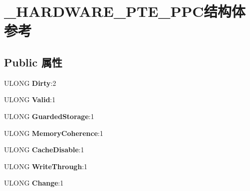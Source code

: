\hypertarget{struct___h_a_r_d_w_a_r_e___p_t_e___p_p_c}{}\section{\+\_\+\+H\+A\+R\+D\+W\+A\+R\+E\+\_\+\+P\+T\+E\+\_\+\+P\+P\+C结构体 参考}
\label{struct___h_a_r_d_w_a_r_e___p_t_e___p_p_c}
\subsection*{Public 属性}
\begin{DoxyCompactItemize}
\item 
\mbox{\label{struct___h_a_r_d_w_a_r_e___p_t_e___p_p_c_a92d2135be96d90cf3a939817af25fd09}} 
U\+L\+O\+NG {\bfseries Dirty}\+:2
\item 
\mbox{\label{struct___h_a_r_d_w_a_r_e___p_t_e___p_p_c_a76baf9bbde54bfa66a3c1a40997d4e3d}} 
U\+L\+O\+NG {\bfseries Valid}\+:1
\item 
\mbox{\label{struct___h_a_r_d_w_a_r_e___p_t_e___p_p_c_a78b95c6358ebbadd0c30df32af6b4ee4}} 
U\+L\+O\+NG {\bfseries Guarded\+Storage}\+:1
\item 
\mbox{\label{struct___h_a_r_d_w_a_r_e___p_t_e___p_p_c_a409dc5ee38c876cd36159cf3aafc65fd}} 
U\+L\+O\+NG {\bfseries Memory\+Coherence}\+:1
\item 
\mbox{\label{struct___h_a_r_d_w_a_r_e___p_t_e___p_p_c_a8a220905c9e76c7d205976d0734299c7}} 
U\+L\+O\+NG {\bfseries Cache\+Disable}\+:1
\item 
\mbox{\label{struct___h_a_r_d_w_a_r_e___p_t_e___p_p_c_a2b2f984b45348caa61ddd1539a16fd57}} 
U\+L\+O\+NG {\bfseries Write\+Through}\+:1
\item 
\mbox{\label{struct___h_a_r_d_w_a_r_e___p_t_e___p_p_c_a0e1bfd1e16592454bad3807e0ecdd7cc}} 
U\+L\+O\+NG {\bfseries Change}\+:1
\item 

\end{DoxyCompactItemize}
